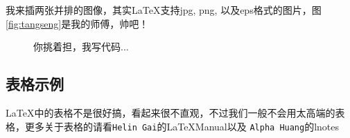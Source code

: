 我来插两张并排的图像，其实\LaTeX 支持jpg, png, 以及eps格式的图片，图\ref{fig:tangseng}是我的师傅，帅吧！

\begin{figure}[htbp]
\centering
{}
\hspace{60pt}
\caption{你挑着担，我写代码...}
\end{figure}

\subsection{表格示例}

\LaTeX 中的表格不是很好搞，看起来很不直观，不过我们一般不会用太高端的表格，更多关于表格的请看\texttt{Helin Gai}的\textsf{\LaTeX Manual}\cite{gaiart}以及
\texttt{Alpha Huang}的\textsf{lnotes}\cite{lnotes}

